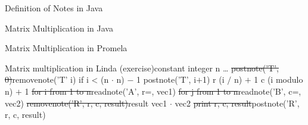 \begin{wideslide}[bm=,toc=]{\large Definition of Notes in Java}
\end{wideslide}

\begin{wideslide}[bm=,toc=]{\large Matrix Multiplication in Java}
\end{wideslide}

\begin{wideslide}[bm=,toc=]{\large Matrix Multiplication in Promela}
\end{wideslide}

\begin{wideslide}[bm=,toc=]{\large }
\begin{alg}{Matrix multiplication in Linda (exercise)}{constant integer n \la{} \ldots}\hline
{}
\st{postnote('T', 0)}{\idt{}removenote('T' i)}
\st{}{\idt{}if i < (n $\cdot$ n) $-$ 1}
\st{}{\idt{}\idt{}postnote('T', i$+$1)}
\st{}{\idt{}r \la{} (i $/$ n) $+$ 1}
\st{}{\idt{}c \la{} (i modulo n) $+$ 1}
\st{for i from 1 to n}{\idt{}readnote('A', r=, vec1)}
\st{\idt{}for j from 1 to n}{\idt{}readnote('B', c=, vec2)}
\st{\idt{}\idt{}removenote('R', r, c, result)}{\idt{}result \la{} vec1 $\cdot$ vec2}
\st{\idt{}\idt{}print r, c, result}{\idt{}postnote('R', r, c, result)}
\end{alg}
\end{wideslide}

